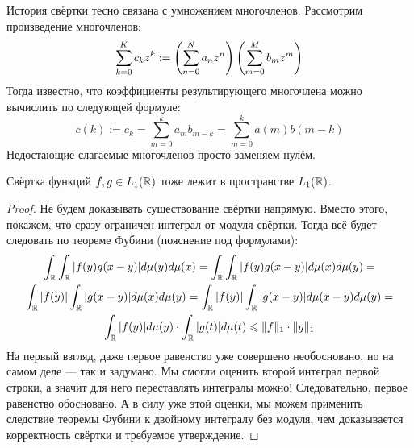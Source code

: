 \begin{note}
	История свёртки тесно связана с умножением многочленов. Рассмотрим произведение многочленов:
	\[
		\sum_{k = 0}^K c_kz^k := \left(\sum_{n = 0}^N a_nz^n\right)\left(\sum_{m = 0}^M b_mz^m\right)
	\]
	Тогда известно, что коэффициенты результирующего многочлена можно вычислить по следующей формуле:
	\[
		c(k) := c_k = \sum_{m = 0}^k a_mb_{m - k} = \sum_{m = 0}^k a(m)b(m - k)
	\]
	Недостающие слагаемые многочленов просто заменяем нулём.
\end{note}

\begin{proposition}
	Свёртка функций $f, g \in L_1(\mathbb{R})$ тоже лежит в пространстве $L_1(\mathbb{R})$.
\end{proposition}

\begin{proof}
	Не будем доказывать существование свёртки напрямую. Вместо этого, покажем, что сразу ограничен интеграл от модуля свёртки. Тогда всё будет следовать по теореме Фубини (пояснение под формулами):
	\begin{multline*}
		\int_{\mathbb{R}} \int_{\mathbb{R}} |f(y)g(x - y)|d\mu(y)d\mu(x) = \int_{\mathbb{R}} \int_{\mathbb{R}} |f(y)g(x - y)|d\mu(x)d\mu(y) =
		\\
		\int_{\mathbb{R}} |f(y)| \int_{\mathbb{R}} |g(x - y)|d\mu(x)d\mu(y) = \int_{\mathbb{R}} |f(y)| \int_{\mathbb{R}} |g(x - y)|d\mu(x - y)d\mu(y) =
		\\
		\int_{\mathbb{R}} |f(y)|d\mu(y) \cdot \int_{\mathbb{R}} |g(t)|d\mu(t) \leqslant \|f\|_1 \cdot \|g\|_1
	\end{multline*}
	На первый взгляд, даже первое равенство уже совершено необосновано, но на самом деле --- так и задумано. Мы смогли оценить второй интеграл первой строки, а значит для него переставлять интегралы можно! Следовательно, первое равенство обосновано. А в силу уже этой оценки, мы можем применить следствие теоремы Фубини к двойному интегралу без модуля, чем доказывается корректность свёртки и требуемое утверждение.
\end{proof}